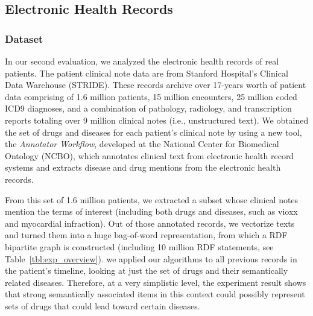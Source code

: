 \subsection{Electronic Health Records}
\subsubsection{Dataset}
In our second evaluation, we analyzed the electronic health records of real patients. The patient clinical note data are from Stanford Hospital's Clinical Data Warehouse (STRIDE). These records archive over 17-years worth of patient data comprising of 1.6 million patients, 15 million encounters, 25 million coded ICD9 diagnoses, and a combination of pathology, radiology, and transcription reports totaling over 9 million clinical notes (i.e., unstructured text).
We obtained the set of drugs and diseases for each patient's clinical note by using a new tool, the \emph{Annotator Workflow}, developed at the National Center for Biomedical Ontology (NCBO), which annotates clinical text from electronic health record systems and extracts disease and drug mentions from the electronic health records.


From this set of 1.6 million patients, we extracted a subset whose clinical notes mention the terms of interest (including both drugs and diseases, such as vioxx and myocardial infraction).  Out of those annotated records, we vectorize texts and turned them into a huge bag-of-word representation, from which a RDF bipartite graph is constructed (including 10 million RDF statements, see Table~\ref{tbl:exp_overview}). we applied our algorithms to all previous records in the patient's timeline, looking at just the set of drugs and their semantically related diseases.  Therefore, at a very simplistic level, the experiment result shows that strong semantically associated items in this context could possibly represent sets of drugs that could lead toward certain diseases.

